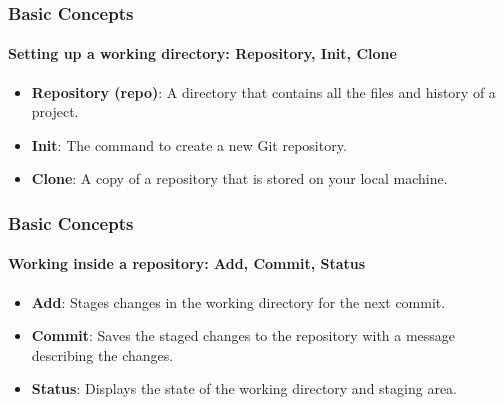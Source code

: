 \documentclass{beamer}
\begin{document}
\begin{frame}\frametitle{Basic Concepts}\framesubtitle{Setting up a working directory: Repository, Init, Clone}
\begin{itemize}
	\item<1-> \textbf{Repository (repo)}: A directory that contains all the files and history of a project.
	\vspace{0.2cm}
	\item<2-> \textbf{Init}: The command to create a new Git repository.
	\vspace{0.2cm}
	\item<3-> \textbf{Clone}: A copy of a repository that is stored on your local machine.
\end{itemize}


\vspace{0.5cm}


\end{frame}

\begin{frame}\frametitle{Basic Concepts}\framesubtitle{Working inside a repository: Add, Commit, Status}
\begin{itemize}
	\item<1-> \textbf{Add}: Stages changes in the working directory for the next commit.
	\vspace{0.2cm}
	\item<2-> \textbf{Commit}: Saves the staged changes to the repository with a message describing the changes.
	\vspace{0.2cm}
	\item<3-> \textbf{Status}: Displays the state of the working directory and staging area.
\end{itemize}
\end{frame}
\end{document}
